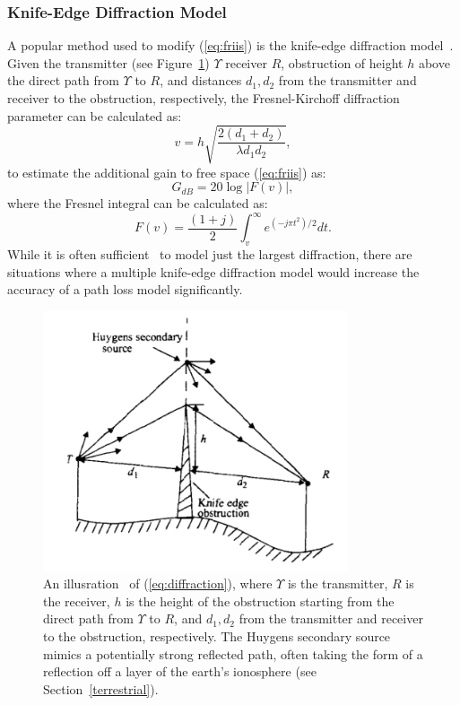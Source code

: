 \subsubsection{Knife-Edge Diffraction Model}
A popular method used to modify (\ref{eq:friis}) is the knife-edge diffraction model~\cite{rappaport1996wireless}. Given the transmitter (see Figure~\ref{fig:knifeedge}) $\Upsilon$ receiver $R$, obstruction of height $h$ above the direct path from $\Upsilon$ to $R$, and distances $d_1, d_2$ from the transmitter and receiver to the obstruction, respectively, the Fresnel-Kirchoff diffraction parameter can be calculated as:
\begin{equation}
\label{eq:v}
v = h\sqrt{\frac{2(d_1+d_2)}{\lambda d_1 d_2}},
\end{equation}
to estimate the additional gain to free space (\ref{eq:friis}) as:
\begin{equation}
\label{eq:diffraction}
G_{dB} = 20 \log |F(v)|,
\end{equation}
where the Fresnel integral can be calculated as:
\begin{equation}
\label{eq:fresnel}
F(v) = \frac{(1+j)}{2} \int_v^{\infty} e^{(-j\pi t^2)/2} dt.
\end{equation}
While it is often sufficient~\cite{rappaport1996wireless} to model just the largest diffraction, there are situations where a multiple knife-edge diffraction model would increase the accuracy of a path loss model significantly. 
\begin{figure}[ht!]
	\centering	\includegraphics[width=0.8\textwidth,keepaspectratio]{figs/knifeedge.png}
    \caption{An illusration~\cite{rappaport1996wireless} of (\ref{eq:diffraction}), where $\Upsilon$ is the transmitter, $R$ is the receiver, $h$ is the height of the obstruction starting from the direct path from $\Upsilon$ to $R$, and $d_1, d_2$ from the transmitter and receiver to the obstruction, respectively. The Huygens secondary source mimics a potentially strong reflected path, often taking the form of a reflection off a layer of the earth's ionosphere (see Section~\ref{terrestrial}).} 
\label{fig:knifeedge}      
\end{figure}
